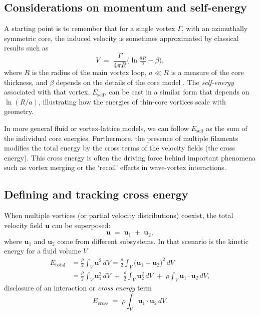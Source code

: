 \subsection{Considerations on momentum and self-energy}
\label{sec:momentum}
A starting point is to remember that for a single vortex $\Gamma$, with an
azimuthally symmetric core, the induced velocity is sometimes approximated by
classical results such as
\begin{equation}
   V \;=\; \frac{\Gamma}{4 \pi R}
   \bigl(\ln \tfrac{8 R}{a} - \beta \bigr),\label{eq:appendix:velocity}
\end{equation}
where $R$ is the radius of the main vortex loop, $a \ll R$ is a measure of the core thickness,
and $\beta$ depends on the details of the core model \cite{Saffman1992}. The
\emph{self-energy} associated with that vortex, $E_{\text{self}}$, can be cast in a
similar form that depends on $\ln(R/a)$, illustrating how the energies of thin-core vortices
scale with geometry.

In more general fluid or vortex-lattice models, we can follow $E_{\text{self}}$ as the
sum of the individual core energies. Furthermore, the presence of multiple filaments
modifies the total energy by the cross terms of the velocity fields (the cross energy). This
cross energy is often the driving force behind important phenomena such as vortex merging or the `recoil' effects
in wave-vortex interactions.

\subsection{Defining and tracking cross energy}
\label{sec:cross}
When multiple vortices (or partial velocity distributions) coexist, the total velocity field $\mathbf{u}$ can be superposed:
\begin{equation}
   \mathbf{u} \;=\; \mathbf{u}_1 \;+\;\mathbf{u}_2,\label{eq:appendix:superpose}
\end{equation}
where $\mathbf{u}_1$ and $\mathbf{u}_2$ come from different subsystems. In that
scenario is the kinetic energy for a fluid volume $V$
\begin{align}
   E_{\text{total}} &= \frac{\rho}{2} \int_V \mathbf{u}^2 \,dV
   = \frac{\rho}{2} \int_V \bigl(\mathbf{u}_1 + \mathbf{u}_2 \bigr)^2\, dV \\
   &= \frac{\rho}{2} \int_V \mathbf{u}_1^2 \,dV \;+\;\frac{\rho}{2} \int_V \mathbf{u}_2^2 \,dV
   \;+\;\rho \int_V \mathbf{u}_1 \cdot \mathbf{u}_2 \, dV,
\end{align}
disclosure of an interaction or \emph{cross energy} term
\begin{equation}
   E_{\text{cross}} \;=\; \rho \int_V \mathbf{u}_1 \cdot \mathbf{u}_2 \, dV.
   \label{eq:cross-term}
\end{equation}

